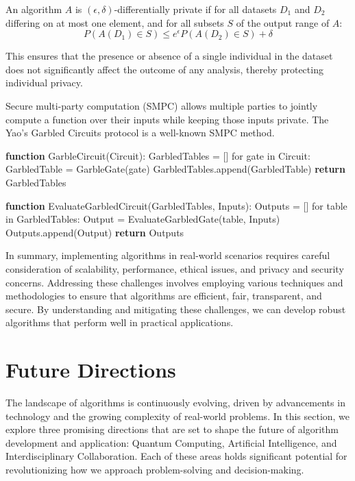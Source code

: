 \documentclass[12pt]{book} %
\begin{document}
An algorithm $A$ is $(\epsilon, \delta)$-differentially private if for all datasets $D_1$ and $D_2$ differing on at most one element, and for all subsets $S$ of the output range of $A$:
\[ P(A(D_1) \in S) \leq e^\epsilon P(A(D_2) \in S) + \delta \]

This ensures that the presence or absence of a single individual in the dataset does not significantly affect the outcome of any analysis, thereby protecting individual privacy.

Secure multi-party computation (SMPC) allows multiple parties to jointly compute a function over their inputs while keeping those inputs private. The Yao's Garbled Circuits protocol is a well-known SMPC method.
\FloatBarrier
\begin{algorithm}[H]
\caption{Yao's Garbled Circuits Protocol (Simplified)}
\begin{algorithmic}
\State \textbf{function} GarbleCircuit(Circuit):
\State \quad GarbledTables = []
\State \quad for gate in Circuit:
\State \quad \quad GarbledTable = GarbleGate(gate)
\State \quad \quad GarbledTables.append(GarbledTable)
\State \quad \textbf{return} GarbledTables

\State \textbf{function} EvaluateGarbledCircuit(GarbledTables, Inputs):
\State \quad Outputs = []
\State \quad for table in GarbledTables:
\State \quad \quad Output = EvaluateGarbledGate(table, Inputs)
\State \quad \quad Outputs.append(Output)
\State \quad \textbf{return} Outputs
\end{algorithmic}
\end{algorithm}

\FloatBarrier

In summary, implementing algorithms in real-world scenarios requires careful consideration of scalability, performance, ethical issues, and privacy and security concerns. Addressing these challenges involves employing various techniques and methodologies to ensure that algorithms are efficient, fair, transparent, and secure. By understanding and mitigating these challenges, we can develop robust algorithms that perform well in practical applications.

\section{Future Directions}
The landscape of algorithms is continuously evolving, driven by advancements in technology and the growing complexity of real-world problems. In this section, we explore three promising directions that are set to shape the future of algorithm development and application: Quantum Computing, Artificial Intelligence, and Interdisciplinary Collaboration. Each of these areas holds significant potential for revolutionizing how we approach problem-solving and decision-making.
\end{document}
